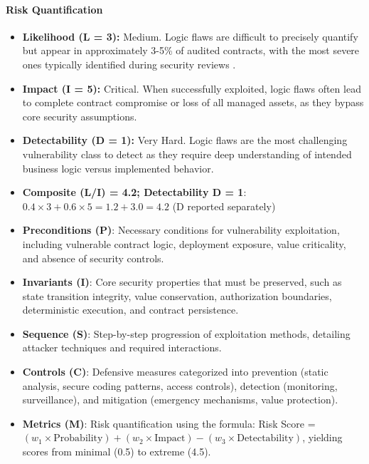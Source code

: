 \paragraph{Risk Quantification}

\begin{itemize}
\item \textbf{Likelihood (L = 3):} Medium. Logic flaws are difficult to precisely quantify but appear in approximately 3-5\% of audited contracts, with the most severe ones typically identified during security reviews \cite{zhou2023sok}.

\item \textbf{Impact (I = 5):} Critical. When successfully exploited, logic flaws often lead to complete contract compromise or loss of all managed assets, as they bypass core security assumptions.

\item \textbf{Detectability (D = 1):} Very Hard. Logic flaws are the most challenging vulnerability class to detect as they require deep understanding of intended business logic versus implemented behavior.

\item \textbf{Composite (L/I) = 4.2; Detectability D = 1}: $0.4 \times 3 + 0.6 \times 5 = 1.2 + 3.0 = 4.2$ (D reported separately)
\end{itemize}
\begin{itemize}
\item \textbf{Preconditions (P)}: Necessary conditions for vulnerability exploitation, including vulnerable contract logic, deployment exposure, value criticality, and absence of security controls.
\item \textbf{Invariants (I)}: Core security properties that must be preserved, such as state transition integrity, value conservation, authorization boundaries, deterministic execution, and contract persistence.
\item \textbf{Sequence (S)}: Step-by-step progression of exploitation methods, detailing attacker techniques and required interactions.
\item \textbf{Controls (C)}: Defensive measures categorized into prevention (static analysis, secure coding patterns, access controls), detection (monitoring, surveillance), and mitigation (emergency mechanisms, value protection).
\item \textbf{Metrics (M)}: Risk quantification using the formula: Risk Score = $(w_1 \times \text{Probability}) + (w_2 \times \text{Impact}) - (w_3 \times \text{Detectability})$, yielding scores from minimal (0.5) to extreme (4.5).
\end{itemize}

